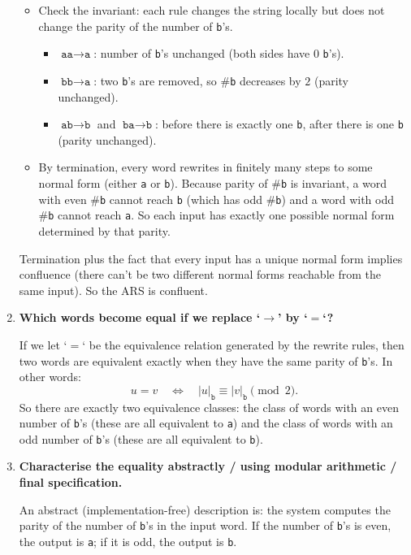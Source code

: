 \documentclass[12pt]{article}
\begin{document}
\begin{enumerate}[label=(\alph*)]
  \begin{itemize}
    \item Check the invariant: each rule changes the string locally but does not change the parity of the number of \texttt{b}'s.
      \begin{itemize}
        \item $\texttt{aa}\to\texttt{a}$: number of \texttt{b}'s unchanged (both sides have 0 \texttt{b}'s).
        \item $\texttt{bb}\to\texttt{a}$: two \texttt{b}'s are removed, so \#\texttt{b} decreases by $2$ (parity unchanged).
        \item $\texttt{ab}\to\texttt{b}$ and $\texttt{ba}\to\texttt{b}$: before there is exactly one \texttt{b}, after there is one \texttt{b} (parity unchanged).
      \end{itemize}
    \item By termination, every word rewrites in finitely many steps to some normal form (either \texttt{a} or \texttt{b}). Because parity of \#\texttt{b} is invariant, a word with even \#\texttt{b} cannot reach \texttt{b} (which has odd \#\texttt{b}) and a word with odd \#\texttt{b} cannot reach \texttt{a}. So each input has exactly one possible normal form determined by that parity.
  \end{itemize}
  
  Termination plus the fact that every input has a unique normal form implies confluence (there can't be two different normal forms reachable from the same input). So the ARS is confluent.
  
  \item \textbf{Which words become equal if we replace `$\to$' by `$=$`?}
  
  If we let `$=$` be the equivalence relation generated by the rewrite rules, then two words are equivalent exactly when they have the same parity of \texttt{b}'s. In other words:
  \[
    u = v \quad\Longleftrightarrow\quad |u|_{\texttt{b}} \equiv |v|_{\texttt{b}} \pmod{2}.
  \]
  So there are exactly two equivalence classes: the class of words with an even number of \texttt{b}'s (these are all equivalent to \texttt{a}) and the class of words with an odd number of \texttt{b}'s (these are all equivalent to \texttt{b}).
  
  \item \textbf{Characterise the equality abstractly / using modular arithmetic / final specification.}
  
  An abstract (implementation-free) description is: the system computes the parity of the number of \texttt{b}'s in the input word. If the number of \texttt{b}'s is even, the output is \texttt{a}; if it is odd, the output is \texttt{b}.
  

\end{enumerate}
\end{document}
